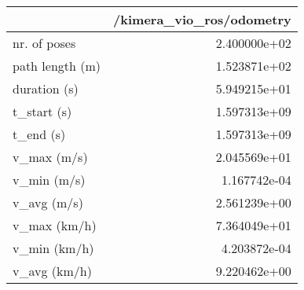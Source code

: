 \begin{tabular}{lr}
\toprule
{} &  /kimera\_vio\_ros/odometry \\
\midrule
nr. of poses    &              2.400000e+02 \\
path length (m) &              1.523871e+02 \\
duration (s)    &              5.949215e+01 \\
t\_start (s)     &              1.597313e+09 \\
t\_end (s)       &              1.597313e+09 \\
v\_max (m/s)     &              2.045569e+01 \\
v\_min (m/s)     &              1.167742e-04 \\
v\_avg (m/s)     &              2.561239e+00 \\
v\_max (km/h)    &              7.364049e+01 \\
v\_min (km/h)    &              4.203872e-04 \\
v\_avg (km/h)    &              9.220462e+00 \\
\bottomrule
\end{tabular}
